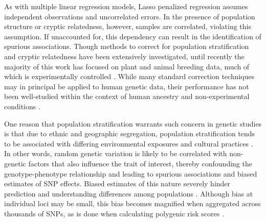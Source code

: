 As with multiple linear regression models, Lasso penalized regression assumes independent observations and uncorrelated errors. In the presence of population structure or cryptic relatedness, however, samples are correlated, violating this assumption. If unaccounted for, this dependency can result in the identification of spurious associations. Though methods to correct for population stratification and cryptic relatedness have been extensively investigated, until recently the majority of this work has focused on plant and animal breeding data, much of which is experimentally controlled \citep{Amin2007, hoffman2013correcting, price2006principal, Rakitsch2012, bhatnagar2019simultaneous, Sillanpaeae2011}. While many standard correction techniques may in principal be applied to human genetic data, their performance has not been well-studied within the context of human ancestry and non-experimental conditions \citep{lawson2019population, barton2019population}.  

One reason that population stratification warrants such concern in genetic studies is that due to ethnic and geographic segregation, population stratification tends to be associated with differing environmental exposures and cultural practices \citep{thornton2015statistical, browning2011population}.  In other words, random genetic variation is likely to be correlated with non-genetic factors that also influence the trait of interest, thereby confounding the genotype-phenotype relationship and leading to spurious associations and biased estimates of SNP effects. Biased estimates of this nature severely hinder prediction and understanding differences among populations \citep{barton2019population}. Although bias at individual loci may be small, this bias becomes magnified when aggregated across thousands of SNPs, as is done when calculating polygenic risk scores \citep{barton2019population, peterson2019genome}.

